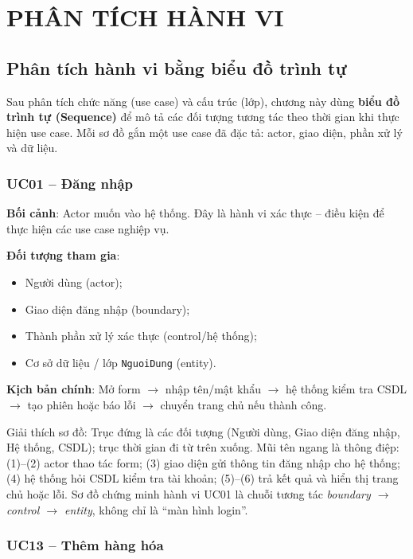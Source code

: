 \chapter{PHÂN TÍCH HÀNH VI}

\section{Phân tích hành vi bằng biểu đồ trình tự}

Sau phân tích chức năng (use case) và cấu trúc (lớp), chương này dùng \textbf{biểu đồ trình tự (Sequence)} để mô tả các đối tượng tương tác theo thời gian khi thực hiện use case. Mỗi sơ đồ gắn một use case đã đặc tả: actor, giao diện, phần xử lý và dữ liệu.

\subsection{UC01 -- Đăng nhập}

\textbf{Bối cảnh}: Actor muốn vào hệ thống. Đây là hành vi xác thực -- điều kiện để thực hiện các use case nghiệp vụ.

\textbf{Đối tượng tham gia}:
\begin{itemize}[leftmargin=1.5cm]
    \item Người dùng (actor);
    \item Giao diện đăng nhập (boundary);
    \item Thành phần xử lý xác thực (control/hệ thống);
    \item Cơ sở dữ liệu / lớp \texttt{NguoiDung} (entity).
\end{itemize}

\textbf{Kịch bản chính}: Mở form $\rightarrow$ nhập tên/mật khẩu $\rightarrow$ hệ thống kiểm tra CSDL $\rightarrow$ tạo phiên hoặc báo lỗi $\rightarrow$ chuyển trang chủ nếu thành công.



Giải thích sơ đồ: Trục đứng là các đối tượng (Người dùng, Giao diện đăng nhập, Hệ thống, CSDL); trục thời gian đi từ trên xuống. Mũi tên ngang là thông điệp: (1)--(2) actor thao tác form; (3) giao diện gửi thông tin đăng nhập cho hệ thống; (4) hệ thống hỏi CSDL kiểm tra tài khoản; (5)--(6) trả kết quả và hiển thị trang chủ hoặc lỗi. Sơ đồ chứng minh hành vi UC01 là chuỗi tương tác \textit{boundary $\rightarrow$ control $\rightarrow$ entity}, không chỉ là ``màn hình login''.

\subsection{UC13 -- Thêm hàng hóa}

